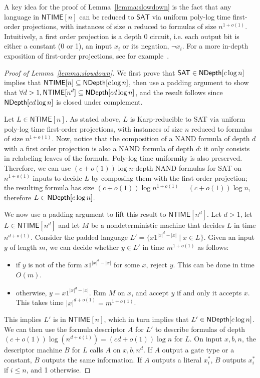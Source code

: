 \documentclass[a4paper, 11pt]{article}
\theoremstyle{plain}
\theoremstyle{definition}
\theoremstyle{remark}
\newcommand{\NTIME}{\textsf{NTIME}}%
\newcommand{\SAT}{\textsf{SAT}}%
\newcommand{\ND}{\textsf{NDepth}}%
\newcommand{\NDL}[1]{\ensuremath\ND[ #1 \log n]}%
\begin{document}
A key idea for the proof of Lemma~\ref{lemma:slowdown} 
is the fact that any language in $\NTIME[n]$ can
be reduced to $\SAT{}$ via uniform poly-log time first-order projections, 
with instances of size $n$ reduced to formulas of size $n^{1+o(1)}$.
Intuitively, a first order projection is a depth 0 circuit, 
i.e. each output bit is either a constant (0 or 1),
an input $x_i$ or its negation, $\neg x_i$.
For a more in-depth exposition of first-order projections,
see for example~\cite[End of Sec.~3]{allender1997first}.
\begin{proof}[Proof of Lemma~\ref{lemma:slowdown}]
	We first prove that $\SAT{}\in \NDL{c}$ implies that $\NTIME[n] \subseteq \NDL{c}$,
	then use a padding argument to show that $\forall d>1, \NTIME[n^d] \subseteq \NDL{cd}$,
	and the result follows since $\NDL{cd}$ is closed under complement.

	Let $L\in\NTIME[n]$. 
	As stated above, $L$ is Karp-reducible to \SAT{} via
	uniform poly-log time first-order projections, 
	with instances of size $n$ reduced to formulas of size $n^{1+o(1)}$.
	Now, notice that the composition of a NAND formula of depth $d$ with a first order projection
	is also a NAND formula of depth $d$: it only consists in relabeling leaves of the formula.
	Poly-log time uniformity is also preserved. 
	Therefore, we can use $(c+o(1)) \log n$-depth NAND formulas for \SAT{} on $n^{1+o(1)}$
	inputs to decide $L$ by composing them with the first order projection; 
	the resulting formula has size $(c+o(1)) \log n^{1+o(1)} = (c+o(1)) \log n$,
	therefore $L\in\NDL{c}$.

	We now use a padding argument to lift this result to $\NTIME[n^d]$.
	Let $d>1$, let $L\in \NTIME[n^d]$ and let $M$ be a nondeterministic machine that decides $L$
	in time $n^{d+o(1)}$.
	Consider the padded language $L' = \{x1^{|x|^d - |x|} \mid x\in L\}$.
	Given an input $y$ of length $m$, we can decide whether $y\in L'$ in time 
	$m^{1+o(1)}$ as follows:
	\begin{itemize}
		\item if $y$ is not of the form $x1^{|x|^d - |x|}$ for some $x$, reject $y$.
		This can be done in time $O(m)$.
		\item otherwise, $y = x1^{|x|^d - |x|}$. Run $M$ on $x$, and accept $y$ 
		if and only it accepts $x$. This takes time $|x|^{d+o(1)} = m^{1+o(1)}$.
	\end{itemize}
	This implies $L'$ is in $\NTIME[n]$, which in turn implies that $L'\in\NDL{c}$.
	We can then use the formula descriptor $A$ for $L'$ 
	to describe formulas of depth $(c + o(1))\log \left(n^{d+o(1)}\right) = (cd + o(1))\log n$ for $L$.
	On input $x,b,n$, the descriptor machine $B$ for $L$  
	calls $A$ on $x, b, n^d$.
	If $A$ output a gate type or a constant, $B$ outputs the same information.
	If $A$ outputs a literal $x_i^*$, $B$ outputs $x_i^*$ if $i \le n$, and 1 otherwise.
\end{proof}
\end{document}
